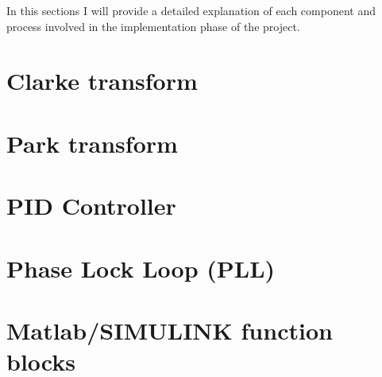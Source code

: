 In this sections I will provide a detailed explanation of each component and
process involved in the implementation phase of the project.

\section{Clarke transform}

\section{Park transform}

\section{PID Controller}

\section{Phase Lock Loop (PLL)}

\section{Matlab/SIMULINK function blocks}

